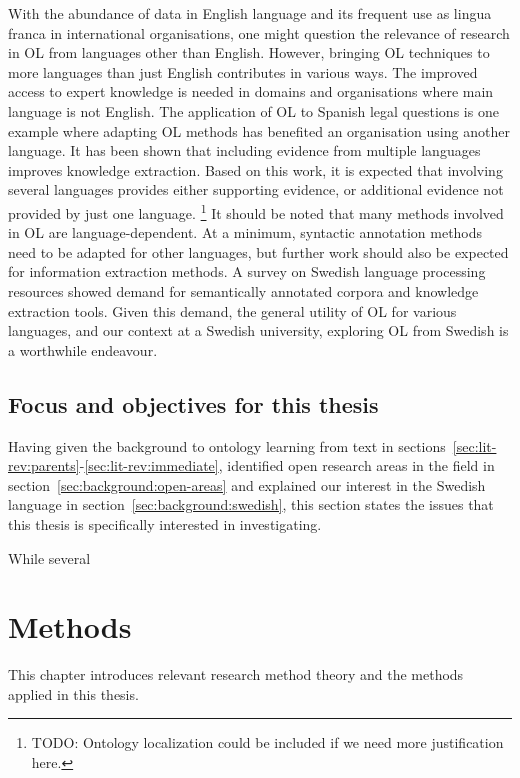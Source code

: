 \documentclass[a4paper]{report}
\newcommand{\todo}[1]{\footnote{{\color{red} TODO: #1}}}
\begin{document}
With the abundance of data in English language and its frequent use as lingua franca in international organisations, one might question the relevance of research in OL from languages other than English.
However, bringing OL techniques to more languages than just English contributes in various ways.
The improved access to expert knowledge is needed in domains and organisations where main language is not English.
The application of OL to Spanish legal questions is one example where adapting OL methods has benefited an organisation using another language\cite{Voelkner2008Spanish}.
It has been shown that including evidence from multiple languages improves knowledge extraction\cite{Hjelm09Thesis}.
Based on this work, it is expected that involving several languages provides either supporting evidence, or additional evidence not provided by just one language\cite{Hjelm09Thesis}.
\todo{Ontology localization could be included if we need more justification here.}
It should be noted that many methods involved in OL are language-dependent.
At a minimum, syntactic annotation methods need to be adapted for other languages, but further work should also be expected for information extraction methods.
A survey on Swedish language processing resources showed demand for semantically annotated corpora and knowledge extraction tools\cite{EleniusEtAl08SwedTools}.
Given this demand, the general utility of OL for various languages, and our context at a Swedish university, exploring OL from Swedish is a worthwhile endeavour.

\section{Focus and objectives for this thesis}
\label{sec:background:our-focus}

Having given the background to ontology learning from text in sections~\ref{sec:lit-rev:parents}-\ref{sec:lit-rev:immediate}, identified open research areas in the field in section~\ref{sec:background:open-areas} and explained our interest in the Swedish language in section~\ref{sec:background:swedish}, this section states the issues that this thesis is specifically interested in investigating.

While several 

\chapter{Methods}

This chapter introduces relevant research method theory and the methods applied in this thesis.
\end{document}
